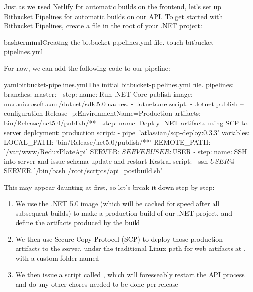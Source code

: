 \documentclass[paper=6in:9in,pagesize=pdftex,headinclude=on,footinclude=on,12pt,twoside]{scrbook}
\begin{document}
Just as we used Netlify for automatic builds on the frontend, let's set up Bitbucket Pipelines for automatic builds on our API. To get started with Bitbucket Pipelines, create a  file in the root of your .NET project:

\begin{codeInput}{bash}{terminal}{Creating the bitbucket-pipelines.yml file.}
touch bitbucket-pipelines.yml  
\end{codeInput}

For now, we can add the following code to our pipeline:

\begin{codeInput}{yaml}{bitbucket-pipelines.yml}{The initial bitbucket-pipelines.yml file.}
  pipelines:
  branches:
    master:
        - step:
            name: Run .NET Core publish
            image: mcr.microsoft.com/dotnet/sdk:5.0
            caches:
                - dotnetcore
            script:
                - dotnet publish --configuration Release -p:EnvironmentName=Production
            artifacts:
                - bin/Release/net5.0/publish/**
        - step:
            name: Deploy .NET artifacts using SCP to server
            deployment: production
            script:
                - pipe: 'atlassian/scp-deploy:0.3.3'
                  variables:
                    LOCAL_PATH: 'bin/Release/net5.0/publish/**'
                    REMOTE_PATH: '/var/www/ReduxPlateApi'
                    SERVER: $SERVER
                    USER: $USER
        - step:
            name: SSH into server and issue schema update and restart Kestral
            script:
                - ssh $USER@$SERVER '/bin/bash /root/scripts/api_postbuild.sh' 
\end{codeInput}

This may appear daunting at first, so let's break it down step by step:

\begin{enumerate}
  \item We use the .NET 5.0 image (which will be cached for speed after all subsequent builds) to make a production build of our .NET project, and define the artifacts produced by the build
  \item We then use Secure Copy Protocol (SCP) to deploy those production artifacts to the server, under the traditional Linux path for web artifacts at , with a custom folder named 
  \item We then issue a script called , which will foreseeably restart the API process and do any other chores needed to be done per-release
\end{enumerate}
\end{document}
